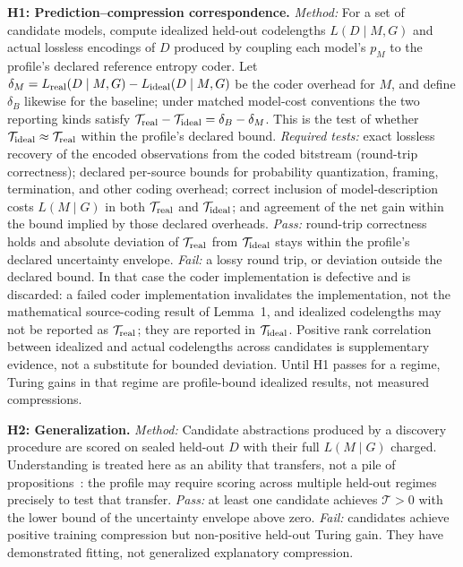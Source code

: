 \documentclass[11pt]{article}
\begin{document}
\textbf{H1: Prediction--compression correspondence.} \textit{Method:} For a set of candidate models, compute idealized held-out codelengths \(L(D\mid M,G)\) and actual lossless encodings of \(D\) produced by coupling each model's \(p_M\) to the profile's declared reference entropy coder. Let \(\delta_M = L_{\rm real}(D\mid M,G)-L_{\rm ideal}(D\mid M,G)\) be the coder overhead for \(M\), and define \(\delta_B\) likewise for the baseline; under matched model-cost conventions the two reporting kinds satisfy \(\mathcal{T}_{\rm real}-\mathcal{T}_{\rm ideal}=\delta_B-\delta_M\). This is the test of whether \(\mathcal{T}_{\rm ideal}\approx\mathcal{T}_{\rm real}\) within the profile's declared bound. \textit{Required tests:} exact lossless recovery of the encoded observations from the coded bitstream (round-trip correctness); declared per-source bounds for probability quantization, framing, termination, and other coding overhead; correct inclusion of model-description costs \(L(M\mid G)\) in both \(\mathcal{T}_{\rm real}\) and \(\mathcal{T}_{\rm ideal}\); and agreement of the net gain within the bound implied by those declared overheads. \textit{Pass:} round-trip correctness holds and absolute deviation of \(\mathcal{T}_{\rm real}\) from \(\mathcal{T}_{\rm ideal}\) stays within the profile's declared uncertainty envelope. \textit{Fail:} a lossy round trip, or deviation outside the declared bound. In that case the coder implementation is defective and is discarded: a failed coder implementation invalidates the implementation, not the mathematical source-coding result of Lemma~1, and idealized codelengths may not be reported as \(\mathcal{T}_{\rm real}\); they are reported in \(\mathcal{T}_{\rm ideal}\). Positive rank correlation between idealized and actual codelengths across candidates is supplementary evidence, not a substitute for bounded deviation. Until H1 passes for a regime, Turing gains in that regime are profile-bound idealized results, not measured compressions.

\textbf{H2: Generalization.} \textit{Method:} Candidate abstractions produced by a discovery procedure are scored on sealed held-out \(D\) with their full \(L(M\mid G)\) charged. Understanding is treated here as an ability that transfers, not a pile of propositions~\cite{dellsen2016}: the profile may require scoring across multiple held-out regimes precisely to test that transfer. \textit{Pass:} at least one candidate achieves \(\mathcal{T}>0\) with the lower bound of the uncertainty envelope above zero. \textit{Fail:} candidates achieve positive training compression but non-positive held-out Turing gain. They have demonstrated fitting, not generalized explanatory compression.
\end{document}
